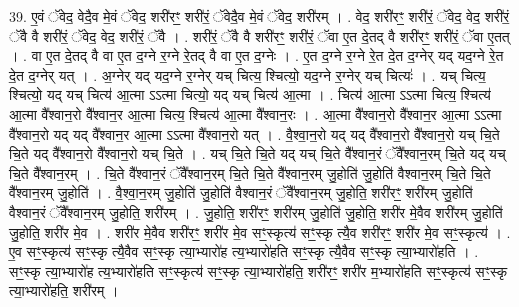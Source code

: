 \documentclass[17pt]{extarticle}
\begin{document}
39. ए॒वं ॅवेद॒ वेदै॒व मे॒वं ॅवेद॒ शरी॑रꣳ॒॒ शरी॑रं॒ ॅवेदै॒व मे॒वं ॅवेद॒ शरी॑रम् । . वेद॒ शरी॑रꣳ॒॒ शरी॑रं॒ ॅवेद॒ वेद॒ शरी॑रं॒ ॅवै वै शरी॑रं॒ ॅवेद॒ वेद॒ शरी॑रं॒ ॅवै । . शरी॑रं॒ ॅवै वै शरी॑रꣳ॒॒ शरी॑रं॒ ॅवा ए॒त दे॒तद् वै शरी॑रꣳ॒॒ शरी॑रं॒ ॅवा ए॒तत् । . वा ए॒त दे॒तद् वै वा ए॒त द॒ग्ने र॒ग्ने रे॒तद् वै वा ए॒त द॒ग्नेः । . ए॒त द॒ग्ने र॒ग्ने रे॒त दे॒त द॒ग्नेर् यद् यद॒ग्ने रे॒त दे॒त द॒ग्नेर् यत् । . अ॒ग्नेर् यद् यद॒ग्ने र॒ग्नेर् यच् चित्य॒ श्चित्यो॒ यद॒ग्ने र॒ग्नेर् यच् चित्यः॑ । . यच् चित्य॒ श्चित्यो॒ यद् यच् चित्य॑ आ॒त्मा ऽऽत्मा चित्यो॒ यद् यच् चित्य॑ आ॒त्मा । . चित्य॑ आ॒त्मा ऽऽत्मा चित्य॒ श्चित्य॑ आ॒त्मा वै᳚श्वान॒रो वै᳚श्वान॒र आ॒त्मा चित्य॒ श्चित्य॑ आ॒त्मा वै᳚श्वान॒रः । . आ॒त्मा वै᳚श्वान॒रो वै᳚श्वान॒र आ॒त्मा ऽऽत्मा वै᳚श्वान॒रो यद् यद् वै᳚श्वान॒र आ॒त्मा ऽऽत्मा वै᳚श्वान॒रो यत् । . वै॒श्वा॒न॒रो यद् यद् वै᳚श्वान॒रो वै᳚श्वान॒रो यच् चि॒ते चि॒ते यद् वै᳚श्वान॒रो वै᳚श्वान॒रो यच् चि॒ते । . यच् चि॒ते चि॒ते यद् यच् चि॒ते वै᳚श्वान॒रं ॅवै᳚श्वान॒रम् चि॒ते यद् यच् चि॒ते वै᳚श्वान॒रम् । . चि॒ते वै᳚श्वान॒रं ॅवै᳚श्वान॒रम् चि॒ते चि॒ते वै᳚श्वान॒रम् जु॒होति॑ जु॒होति॑ वैश्वान॒रम् चि॒ते चि॒ते वै᳚श्वान॒रम् जु॒होति॑ । . वै॒श्वा॒न॒रम् जु॒होति॑ जु॒होति॑ वैश्वान॒रं ॅवै᳚श्वान॒रम् जु॒होति॒ शरी॑रꣳ॒॒ शरी॑रम् जु॒होति॑ वैश्वान॒रं ॅवै᳚श्वान॒रम् जु॒होति॒ शरी॑रम् । . जु॒होति॒ शरी॑रꣳ॒॒ शरी॑रम् जु॒होति॑ जु॒होति॒ शरी॑र मे॒वैव शरी॑रम् जु॒होति॑ जु॒होति॒ शरी॑र मे॒व । . शरी॑र मे॒वैव शरी॑रꣳ॒॒ शरी॑र मे॒व सꣳ॒॒स्कृत्य॑ सꣳ॒॒स्कृ त्यै॒व शरी॑रꣳ॒॒ शरी॑र मे॒व सꣳ॒॒स्कृत्य॑ । . ए॒व सꣳ॒॒स्कृत्य॑ सꣳ॒॒स्कृ त्यै॒वैव सꣳ॒॒स्कृ त्या॒भ्यारो॑ह त्य॒भ्यारो॑हति सꣳ॒॒स्कृ त्यै॒वैव सꣳ॒॒स्कृ त्या॒भ्यारो॑हति । . सꣳ॒॒स्कृ त्या॒भ्यारो॑ह त्य॒भ्यारो॑हति सꣳ॒॒स्कृत्य॑ सꣳ॒॒स्कृ त्या॒भ्यारो॑हति॒ शरी॑रꣳ॒॒ शरी॑र म॒भ्यारो॑हति सꣳ॒॒स्कृत्य॑ सꣳ॒॒स्कृ त्या॒भ्यारो॑हति॒ शरी॑रम् । \newline
\pagebreak
{}
\end{document}
